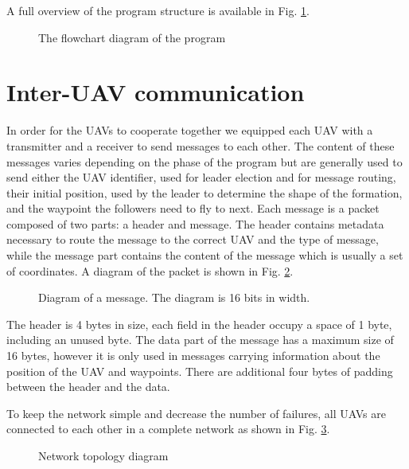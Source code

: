 A full overview of the program structure is available in Fig. \ref{fig:flowchart}.

\begin{figure}
	\begin{center}
		
	\end{center}
	\caption{The flowchart diagram of the program}\label{fig:flowchart}
\end{figure}

\section{Inter-UAV communication}

In order for the UAVs to cooperate together we equipped each UAV with a transmitter and a 
receiver to send messages to each other. The content of these messages varies depending
on the phase of the program but are generally used to send either the UAV identifier, used
for leader election and for message routing, their initial position, used by the leader
to determine the shape of the formation, and the waypoint the followers need to fly to next. 
Each message is a packet composed of two parts: a header and message. The header contains
metadata necessary to route the message to the correct UAV and the type of message, while 
the message part contains the content of the message which is usually a set of coordinates. 
A diagram of the packet is shown in Fig. \ref{fig:packet}.

\begin{figure}[h]
	\begin{center}
		
	\end{center}
	\caption{Diagram of a message. The diagram is 16 bits in width.}\label{fig:packet}
\end{figure}

The header is 4 bytes in size, each field in the header occupy a space of 1 byte, including an 
unused byte. The data part of the message has a maximum size of 16 bytes, however it is only 
used in messages carrying information about the position of the UAV and waypoints. There are 
additional four bytes of padding between the header and the data.

To keep the network simple and decrease the number of failures, all UAVs are connected to each 
other in a complete network as shown in Fig. \ref{fig:net}.

\begin{figure}
	\begin{center}
		
	\end{center}
	\caption{Network topology diagram}\label{fig:net}
\end{figure}

